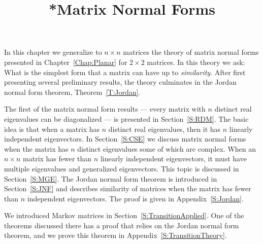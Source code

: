 \documentclass{ximera}
\title{*Matrix Normal Forms}
\begin{document}
\begin{abstract}
\end{abstract}
\maketitle

\label{C:MNF}
\normalsize
 
In this chapter we generalize to $n\times n$ matrices the theory of matrix 
normal forms presented in Chapter~\ref{Chap:Planar} for $2\times 2$ 
matrices.  In this theory we ask: What is the simplest form that a matrix 
can have up to {\em similarity\/}.  After first presenting several 
preliminary results, the theory culminates in the Jordan normal form theorem, Theorem~\ref{T:Jordan}. 

The first of the matrix normal form results --- every matrix with 
$n$ distinct real eigenvalues can be diagonalized --- is presented 
in Section~\ref{S:RDM}.  The basic idea is that when a matrix has $n$
distinct real eigenvalues, then it has $n$ linearly independent 
eigenvectors.  In Section~\ref{S:CSE} we discuss matrix normal forms 
when the matrix has $n$ distinct eigenvalues some of which are complex.  
When an $n\times n$ matrix has fewer than $n$ linearly independent 
eigenvectors, it must have multiple eigenvalues and generalized eigenvectors.  
This topic is discussed in Section~\ref{S:MGE}.  The Jordan normal form theorem 
is introduced in Section~\ref{S:JNF} and describes similarity of matrices when 
the matrix has fewer than $n$ independent eigenvectors.  The proof is 
given in Appendix~\ref{S:Jordan}.

We introduced Markov matrices in Section~\ref{S:TransitionApplied}.  
One of the theorems discussed there has a proof that relies on the 
Jordan normal form theorem, and we prove this theorem in 
Appendix~\ref{S:TransitionTheory}.
 
\end{document}
